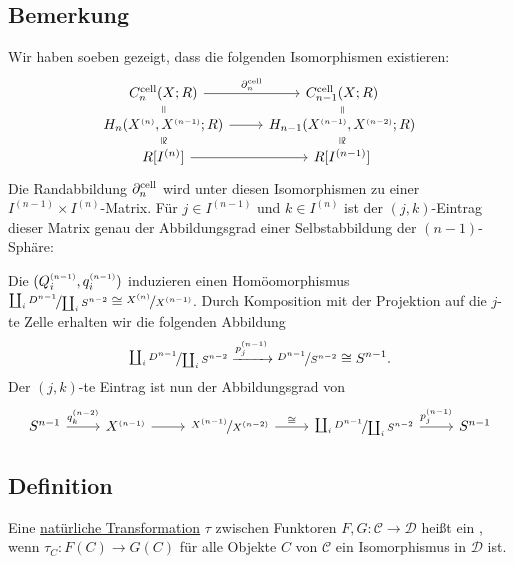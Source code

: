 \subsection[Bemerkung: Matrixform der Randabbildung $\partial_n^{\cell}$]{Bemerkung} %
\label{sub:126}
Wir haben soeben gezeigt, dass die folgenden Isomorphismen existieren:
\[
	\begin{tikzcd}[row sep=tiny]
		C_n^{\cell}(X;R) \arrow[draw=none]{d}[sloped,auto=false]{=} \rar["\partial_n^{\cell}"] & C_{n-1}^{\cell}(X;R) \arrow[draw=none]{d}[sloped,auto=false]{=}\\
		H_n \enbrace*{X^\ssbrace{n},X^\ssbrace{n-1};R} \rar \arrow[draw=none]{d}[sloped,auto=false]{\cong}
		& H_{n-1} \enbrace*{X^\ssbrace{n-1},X^\ssbrace{n-2};R} \arrow[draw=none]{d}[sloped,auto=false]{\cong}\\
		R[I^{(n)}] \rar & R[I^{(n-1)}]  
	\end{tikzcd}
\]
Die Randabbildung $\partial_n^{\cell}$ wird unter diesen Isomorphismen zu einer $I^{(n-1)} \times I^{(n)}$-Matrix. Für $j \in I^{(n-1)}$ und $k \in I^{(n)}$ ist der 
$(j,k)$-Eintrag dieser Matrix genau der Abbildungsgrad einer Selbstabbildung der $(n-1)$-Sphäre: 

Die $(Q_i^{\scriptscriptstyle(n-1)}, q_i^{\scriptscriptstyle(n-1)})$ induzieren einen Homöomorphismus
$\nicefrac{\coprod_i D^{n-1}}{\coprod_i S^{n-2}} \cong \nicefrac{X^{\scriptscriptstyle(n)}}{X^{\scriptscriptstyle(n-1)}}$. Durch Komposition mit der Projektion auf die $j$-te Zelle erhalten 
wir die folgenden Abbildung
\[
	\nicefrac{\coprod_i D^{n-1}}{\coprod_i S^{n-2}} \xrightarrow{p_j^{(n-1)}}  \nicefrac{D^{n-1}}{S^{n-2}} \cong S^{n-1}.
\] 
Der $(j,k)$-te Eintrag ist nun der 
Abbildungsgrad von 
\[
	\begin{tikzcd}
		S^{n-1} \rar["q^{(n-2)}_k"] & X^\ssbrace{n-1} \rar & \nicefrac{X^\ssbrace{n-1}}{X^\ssbrace{n-2}} \rar["\cong"] & \nicefrac{\coprod_i D^{n-1}}{\coprod_i S^{n-2}} \rar["p_j^{(n-1)}"]
		& S^{n-1}
	\end{tikzcd}
\]

\subsection[Definition: Natürlicher Isomorphismus]{Definition} %
\label{sub:127}
Eine \hyperref[sub:16]{natürliche Transformation} $\tau$ zwischen Funktoren $F,G\colon \mathcal{C} \to \mathcal{D}$ heißt ein , wenn 
$\tau_C \colon F(C) \to G(C)$ für alle Objekte $C$ von $\mathcal{C}$ ein Isomorphismus in $\mathcal{D}$ ist.

